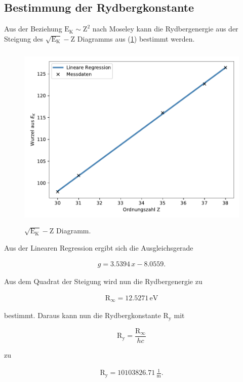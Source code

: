 \subsection{Bestimmung der Rydbergkonstante}    

\noindent
Aus der Beziehung $\text{E}_\text{K} \sim \text{Z}^2$ nach Moseley
kann die Rydbergenergie aus der Steigung des $ \sqrt{\text{E}_\text{K}}-\text{Z}$ Diagramms aus (\ref{fig:mose}) bestimmt werden.

\begin{figure}
    \centering
       \includegraphics[height=9cm]{daten/mose.pdf}
       \caption{$\sqrt{\text{E}_\text{K}}-\text{Z}$ Diagramm.}
       \label{fig:mose}
\end{figure}

\noindent
Aus der Linearen Regression ergibt sich die Ausgleichsgerade

\begin{align*}
    g=3.5394\, x -8.0559.
\end{align*}

\noindent
Aus dem Quadrat der Steigung wird nun die Rydbergenergie zu 

\begin{align*}
    \text{R}_\infty =12.5271 \, \mathrm{eV}
\end{align*}

\noindent
bestimmt.
Daraus kann nun die Rydbergkonstante $\text{R}_\text{y}$ mit

\begin{equation*}
 \text{R}_\text{y}=\frac{\text{R}_\infty}{hc}
\end{equation*}

\noindent
zu 

\begin{align*}
\text{R}_\text{y} =10103826.71 \, \frac{1}{\text{m}}.
\end{align*}